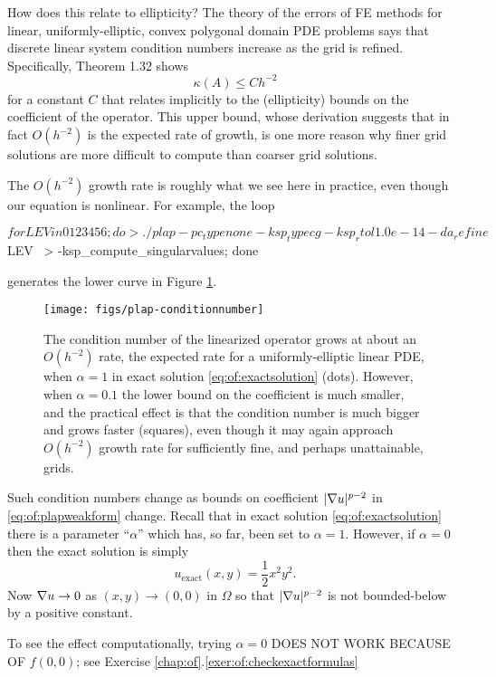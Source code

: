 How does this relate to ellipticity?  The theory of the errors of FE methods for linear, uniformly-elliptic, convex polygonal domain PDE problems says that discrete linear system condition numbers increase as the grid is refined.  Specifically,  \citet{Elmanetal2005} Theorem 1.32 shows
    $$\kappa(A) \le C h^{-2}$$
for a constant $C$ that relates implicitly to the (ellipticity) bounds on the coefficient of the operator.  This upper bound, whose derivation suggests that in fact $O(h^{-2})$ is the expected rate of growth, is one more reason why finer grid solutions are more difficult to compute than coarser grid solutions.

The $O(h^{-2})$ growth rate is roughly what we see here in practice, even though our equation is nonlinear.  For example, the loop
\begin{cline}
$ for LEV in 0 1 2 3 4 5 6; do
>   ./plap -pc_type none -ksp_type cg -ksp_rtol 1.0e-14 -da_refine $LEV \
>      -ksp_compute_singularvalues; done
\end{cline}
generates the lower curve in Figure \ref{fig:of:plap-conditionnumber}.

\begin{figure}
\texttt{[image: figs/plap-conditionnumber]}
\caption{The condition number of the linearized operator grows at about an $O(h^{-2})$ rate, the expected rate for a uniformly-elliptic linear PDE, when $\alpha=1$ in exact solution \eqref{eq:of:exactsolution} (dots).  However, when $\alpha=0.1$ the lower bound on the coefficient is much smaller, and the practical effect is that the condition number is much bigger and grows faster (squares), even though it may again approach $O(h^{-2})$ growth rate for sufficiently fine, and perhaps unattainable, grids.}
\label{fig:of:plap-conditionnumber}
\end{figure}

Such condition numbers change as bounds on coefficient $|\nabla u|^{p-2}$ in  \eqref{eq:of:plapweakform} change.  Recall that in exact solution \eqref{eq:of:exactsolution} there is a parameter ``$\alpha$'' which has, so far, been set to $\alpha = 1$.  However, if $\alpha=0$ then the exact solution is simply
\begin{equation}
    u_{\text{exact}}(x,y) = \frac{1}{2} x^2 y^2. \label{eq:of:exactsolutionbad}
\end{equation}
Now $\nabla u \to 0$ as $(x,y)\to(0,0)$ in $\Omega$ so that $|\nabla u|^{p-2}$ is not bounded-below by a positive constant.

To see the effect computationally, trying $\alpha=0$ DOES NOT WORK BECAUSE OF $f(0,0)$; see   Exercise \ref{chap:of}.\ref{exer:of:checkexactformulas}

